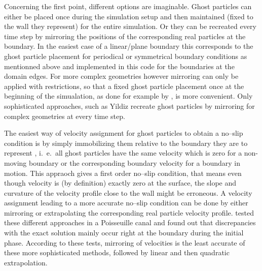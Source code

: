 \documentclass{report}
\begin{document}
Concerning the first point, different options are imaginable. Ghost particles can either be placed once during the simulation setup and then maintained (fixed to the wall they represent) for the entire simulation. Or they can be recreated every time step by mirroring the positions of the corresponding real particles at the boundary. In the easiest case of a linear/plane boundary this corresponds to the ghost particle placement for periodical or symmetrical boundary conditions as mentionned above and implemented in this code for the boundaries at the domain edges.
For more complex geometries however mirroring can only be applied with restrictions, so that a fixed ghost particle placement once at the beginning of the simualation, as done for example by \cite{Morris1997, Zhu1999}, is more convenient. Only sophisticated approaches, such as Yildiz \cite{Yildiz2009} recreate ghost particles by mirroring for complex geometries at every time step.

The easiest way of velocity assignment for ghost particles to obtain a no--slip condition is by simply immobilizing them relative to the boundary they are to represent \cite{Morris1997}, i.\ e.\ all ghost particles have the same velocity which is zero for a non-moving boundary or the corresponding boundary velocity for a boundary in motion. This appraoch gives a first order 
no--slip condition, that means even though velocity is (by definition) exactly zero at the surface, the slope and curvature of the velocity profile close to the wall might be erroneous.  A velocity assignment leading to a more accurate no--slip condition can be done by either mirroring or extrapolating the corresponding real particle velocity profile. \cite{Basa2009} tested these different approaches in a Poisseuille canal and found out that discrepancies with the exact solution mainly occur right at the boundary during the initial phase.  According to these tests, mirroring of velocities is the least accurate of these more sophisticated methods, followed by linear and then quadratic extrapolation. 
\end{document}
